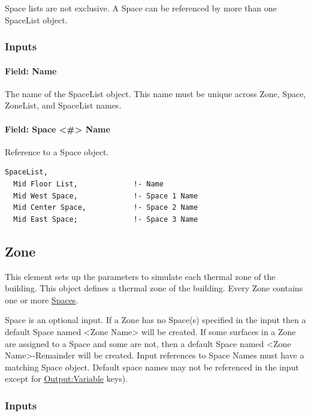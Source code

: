 Space lists are not exclusive. A Space can be referenced by more than one SpaceList object.

\subsubsection{Inputs}\label{inputs-1-045space}

\paragraph{Field: Name}\label{field-space-list-name-000}

The name of the SpaceList object. This name must be unique across Zone, Space, ZoneList, and SpaceList names.

\paragraph{Field: Space \textless{}\#\textgreater{} Name}\label{field-space-name}

Reference to a Space object.

\begin{lstlisting}
SpaceList,
  Mid Floor List,             !- Name
  Mid West Space,             !- Space 1 Name
  Mid Center Space,           !- Space 2 Name
  Mid East Space;             !- Space 3 Name
\end{lstlisting}


\subsection{Zone}\label{zone}

This element sets up the parameters to simulate each thermal zone of the building.
This object defines a thermal zone of the building. Every Zone contains one or more \hyperref[space]{Spaces}.

Space is an optional input. If a Zone has no Space(s) specified in the input then a default Space named \textless{}Zone Name\textgreater{} will be created.
If some surfaces in a Zone are assigned to a Space and some are not, then a default Space
named \textless{}Zone Name\textgreater{}-Remainder will be created.
Input references to Space Names must have a matching Space object.
Default space names may not be referenced in the input except for \hyperref[outputvariable]{Output:Variable} keys).

\subsubsection{Inputs}\label{inputs-048}


